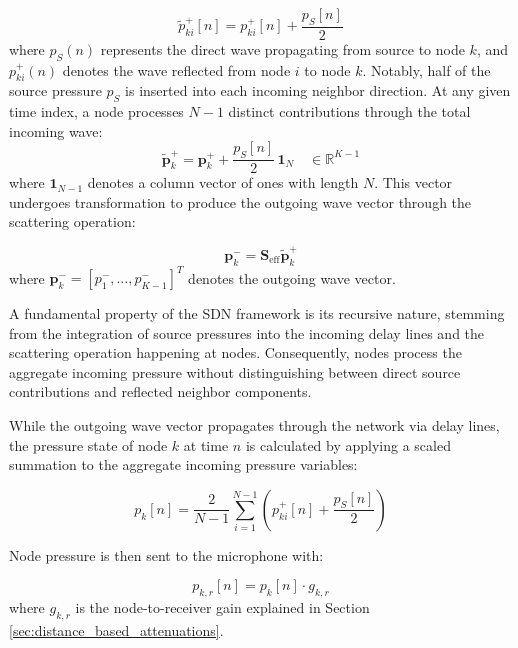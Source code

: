 \documentclass[journal]{IEEEtran}
\begin{document}
\begin{equation}
\label{eq:incoming_wave}
\tilde p_{ki}^+[n] = p_{ki}^+[n] + \frac{p_{S}[n]}{2}
\end{equation}
%
where \(p_{S}(n)\) represents the direct wave propagating from
source to node \(k\), and \(p_{ki}^{+}(n)\) denotes the wave reflected from
node \(i\) to node \(k\). Notably, half of the source
pressure \(p_{S}\) is inserted into each incoming neighbor direction.
At any given time index, a node processes $N-1$ distinct
contributions through the total incoming wave:
%
\begin{equation}
\label{eq:p_tilde}
\tilde{\mathbf{p}}_k^+ = \mathbf{p}_k^+ + \frac{p_{S}[n]}{2}\,\mathbf{1}_N\quad \in \mathbb{R}^{K-1}
\end{equation}
%
where $\mathbf{1}_{N-1}$ denotes a column vector of ones with length $N$.
This vector undergoes transformation to produce the outgoing wave vector through the scattering operation:
    
\begin{equation}
\label{eq:scattering_operation}
{\mathbf{p}}_k^- = \mathbf{S}_{\text{eff}}\tilde{\mathbf{p}}_k^+
\end{equation}
%
where \(\mathbf{p}_{k}^- = [p_{1}^-, \ldots, p_{K-1}^-]^T\) denotes the outgoing wave vector.

A fundamental property of the SDN framework is its recursive nature,
stemming from the integration of source pressures into the incoming
delay lines and the scattering operation happening at nodes. 
Consequently, nodes process the aggregate incoming pressure without
distinguishing between direct source contributions and reflected
neighbor components.

While the outgoing wave vector propagates through the network via delay
lines, the pressure state of node \(k\) at time \(n\) is calculated 
by applying a scaled summation to the aggregate incoming pressure variables:

\begin{equation}
\label{eq:node_pressure}
p_k[n] = \frac{2}{N-1} \sum_{i=1}^{N-1} \left(p_{ki}^+[n] + \frac{p_{S}[n]}{2}\right)
\end{equation}

Node pressure is then sent to the microphone with:

\begin{equation}
\label{eq:node_to_mic_gain}
p_{k,r}[n] = p_k[n] \cdot g_{k,r}
\end{equation}
%
where \(g_{k,r}\) is the node-to-receiver gain explained in Section \ref{sec:distance_based_attenuations}.  
\end{document}
